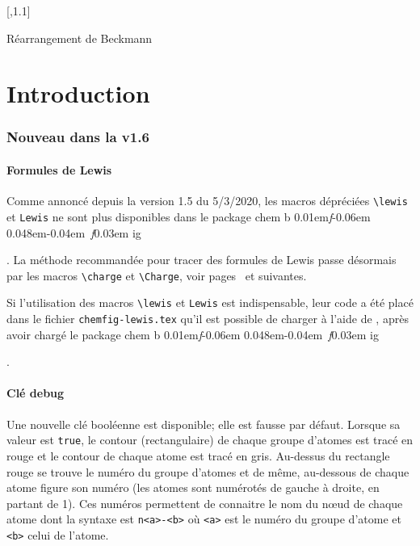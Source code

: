 \documentclass[10pt,french]{article}
\makeatletter
\DeclareRobustCommand\CF{%
	\textsf{%
		chem%
		\if\string b\detokenize\expandafter{\f@series}%
			\lower0.01em\hbox{\itshape f}\kern-0.06em
		\else
			\lower0.048em\hbox{\kern-0.04em \itshape f}\kern0.03em
		\fi ig%
		}%
		\xspace
}
\newcommand*\CFkey[1]{{\color{teal}\texttt{\detokenize{#1}}}}
\makeatother
\begin{document}
\begin{titlepage}
{		  \chemleft[{\subscheme[90]{%
		    \chemfig{R'-\chemabove{N}{\scriptstyle\oplus}~C-R}
		    \arrow{<->}[,0.75]
		    \chemfig{R'-\charge{90=\:}{N}=@{a1}\chemabove{C}{\scriptstyle\oplus}-R}}}\chemright]
		  \arrow{<=>[\chemfig{H_2@{a0}\charge{0=\:,90=\:}{O}}]}[,1.1]
		  \arrow
		\schemestop\hss}\hfill\null
	\begin{center}
		\sffamily\small Réarrangement de Beckmann%
	\end{center}
\end{titlepage}
\parindent0pt\pagestyle{plain}
\tableofcontents
\parskip\medskipamount
\newpage

\part{Introduction}
\section{Nouveau dans la v1.6}
\subsection{Formules de Lewis}
Comme annoncé depuis la version 1.5 du 5/3/2020, les macros dépréciées \verb|\lewis| et \verb|Lewis| ne sont plus disponibles dans le package \CF. La méthode recommandée pour tracer des formules de Lewis passe désormais par les macros \verb|\charge| et \verb|\Charge|, voir pages~\pageref{charge} et suivantes.

Si l'utilisation des macros \verb|\lewis| et \verb|Lewis| est indispensable, leur code a été placé dans le fichier \verb|chemfig-lewis.tex| qu'il est possible de charger à l'aide de \verb||, après avoir chargé le package \CF.

\subsection{Clé debug}
Une nouvelle clé booléenne \CFkey{debug} est disponible; elle est fausse par défaut. Lorsque sa valeur est \verb|true|, le contour (rectangulaire) de chaque groupe d'atomes est tracé en rouge et le contour de chaque atome est tracé en gris. Au-dessus du rectangle rouge se trouve le numéro du groupe d'atomes et de même, au-dessous de chaque atome figure son numéro (les atomes sont numérotés de gauche à droite, en partant de 1). Ces numéros permettent de connaitre le nom du nœud de chaque atome dont la syntaxe est \verb|n<a>-<b>| où \verb|<a>| est le numéro du groupe d'atome et \verb|<b>| celui de l'atome.
\end{document}

